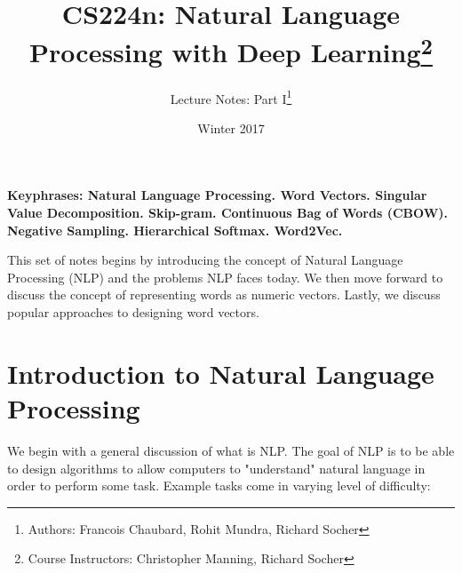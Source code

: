 \documentclass{tufte-handout}
\title{CS224n: Natural Language Processing with Deep Learning\thanks{Course Instructors: Christopher Manning, Richard Socher}}
\author[Francois Chaubard, Rohit Mundra, Richard Socher]{Lecture Notes: Part I\thanks{Authors: Francois Chaubard, Rohit Mundra, Richard Socher}}
\date{Winter 2017} %
\begin{document}
\maketitle%



\textbf{Keyphrases: Natural Language Processing. Word Vectors. Singular Value Decomposition. Skip-gram. Continuous Bag of Words (CBOW). Negative Sampling. Hierarchical Softmax. Word2Vec.}

This set of notes begins by introducing the concept of Natural Language Processing (NLP) and the problems NLP faces today. We then move forward to discuss the concept of representing words as numeric vectors. Lastly, we discuss popular approaches to designing word vectors.


\section{Introduction to Natural Language Processing}\label{sec:intro-nlp}


We begin with a general discussion of what is NLP. The goal of NLP is to be able to design algorithms to allow computers to "understand" natural language in order to perform some task. Example tasks come in varying level of difficulty:
\end{document}
